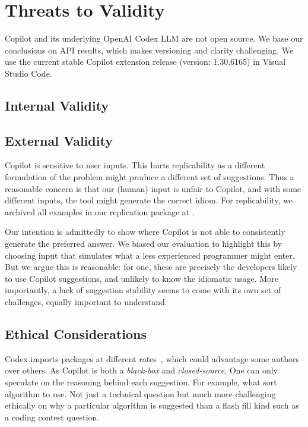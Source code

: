 \section{Threats to Validity}
\label{limitations}
Copilot and its underlying OpenAI Codex LLM are not open source. 
We base our conclusions on API results, which makes versioning and clarity challenging. We use the current stable Copilot extension release (version: 1.30.6165) in Visual Studio Code. %

\subsection{Internal Validity}

\subsection{External Validity}
Copilot is sensitive to user inputs. This hurts replicability as a different formulation of the problem might produce a different set of suggestions. 
Thus a reasonable concern is that our (human) input is unfair to Copilot, and with some different inputs, the tool might generate the correct idiom. 
For replicability, we archived all examples in our replication package at \repl{}.

Our intention is admittedly to show where Copilot is not able to consistently generate the preferred answer. We biased our evaluation to highlight this by choosing input that simulates what a less experienced programmer might enter. 
But we argue this is reasonable: for one, these are precisely the developers likely to use Copilot suggestions, and unlikely to know the idiomatic usage.
More importantly, a lack of suggestion stability seems to come with its own set of challenges, equally important to understand.%
%

\subsection{Ethical Considerations}
\label{ethics}
Codex imports packages at different rates~\cite{copilot}, which could advantage some authors over others. As Copilot is both a \emph{black-box} and \emph{closed-source}, One can only speculate on the reasoning behind each suggestion.  For example, what sort algorithm to use. Not just a technical question but much more challenging ethically on why a particular algorithm is suggested than a flash fill kind such as a coding contest question.